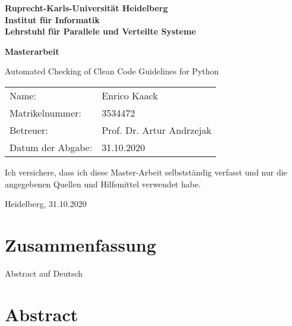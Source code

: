 \documentclass[
     12pt,                    %
     a4paper,             %
     BCOR10mm,     %
     DIV14,                 %
     listof=totoc,                    %
     bibliography=totoc,       %
     index=totoc,              %
     twoside,
     headsepline
     ]{scrreprt}
\begin{document}
\begin{titlepage}


\vspace*{1cm}
\begin{center}
\vspace*{3cm}
\textbf{ 
\Large Ruprecht-Karls-Universität Heidelberg\\
\smallskip
\Large Institut für Informatik\\
\smallskip
\Large Lehrstuhl für Parallele und Verteilte Systeme\\
\smallskip
}

\vspace{3cm}

\textbf{\large Masterarbeit} 

\vspace{0.5\baselineskip}
{\huge
Automated Checking of Clean Code Guidelines for Python
}
\end{center}
\vfill 

{\large
\begin{tabular}[l]{ll}
Name: & Enrico Kaack\\
Matrikelnummer: & 3534472\\
Betreuer: & Prof. Dr. Artur Andrzejak\\
Datum der Abgabe: & 31.10.2020
\end{tabular}
}

\end{titlepage}

\onehalfspacing

\thispagestyle{empty}

\vspace*{100pt}
\noindent
Ich versichere, dass ich diese Master-Arbeit selbstständig verfasst und nur die angegebenen
Quellen und Hilfsmittel verwendet habe.

\vspace*{50pt}

\noindent
Heidelberg, 31.10.2020
\cleardoublepage

\section*{Zusammenfassung}

Abstract auf Deutsch

\section*{Abstract}
\end{document}
